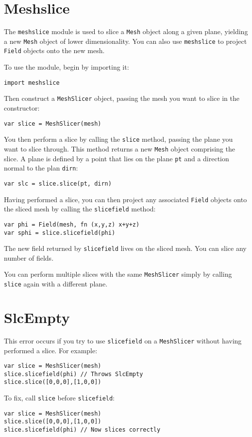 \hypertarget{meshslice}{%
\section{Meshslice}\label{meshslice}}

The \texttt{meshslice} module is used to slice a \texttt{Mesh} object
along a given plane, yielding a new \texttt{Mesh} object of lower
dimensionality. You can also use \texttt{meshslice} to project
\texttt{Field} objects onto the new mesh.

To use the module, begin by importing it:

\begin{lstlisting}
import meshslice 
\end{lstlisting}

Then construct a \texttt{MeshSlicer} object, passing the mesh you want
to slice in the constructor:

\begin{lstlisting}
var slice = MeshSlicer(mesh)
\end{lstlisting}

You then perform a slice by calling the \texttt{slice} method, passing
the plane you want to slice through. This method returns a new
\texttt{Mesh} object comprising the slice. A plane is defined by a point
that lies on the plane \texttt{pt} and a direction normal to the plan
\texttt{dirn}:

\begin{lstlisting}
var slc = slice.slice(pt, dirn)
\end{lstlisting}

Having performed a slice, you can then project any associated
\texttt{Field} objects onto the sliced mesh by calling the
\texttt{slicefield} method:

\begin{lstlisting}
var phi = Field(mesh, fn (x,y,z) x+y+z)
var sphi = slice.slicefield(phi)
\end{lstlisting}

The new field returned by \texttt{slicefield} lives on the sliced mesh.
You can slice any number of fields.

You can perform multiple slices with the same \texttt{MeshSlicer} simply
by calling \texttt{slice} again with a different plane.

\hypertarget{slcempty}{%
\section{SlcEmpty}\label{slcempty}}

This error occurs if you try to use \texttt{slicefield} on a
\texttt{MeshSlicer} without having performed a slice. For example:

\begin{lstlisting}
var slice = MeshSlicer(mesh)
slice.slicefield(phi) // Throws SlcEmpty
slice.slice([0,0,0],[1,0,0]) 
\end{lstlisting}

To fix, call \texttt{slice} before \texttt{slicefield}:

\begin{lstlisting}
var slice = MeshSlicer(mesh)
slice.slice([0,0,0],[1,0,0]) 
slice.slicefield(phi) // Now slices correctly 
\end{lstlisting}
